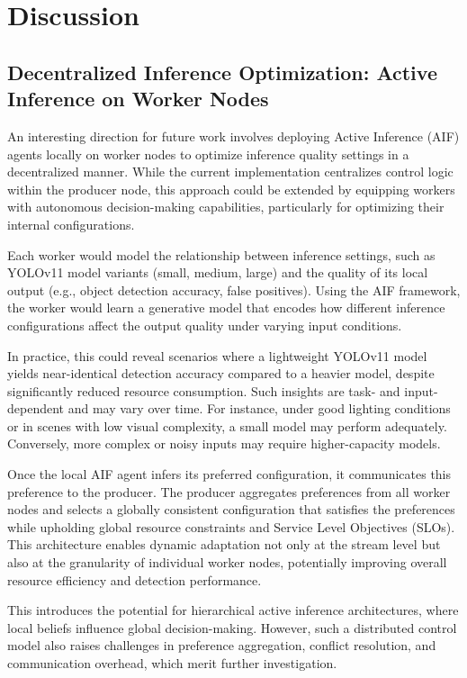 \chapter{Discussion}
\section{Decentralized Inference Optimization: Active Inference on Worker Nodes}

An interesting direction for future work involves deploying Active Inference (AIF) agents locally on worker nodes to optimize inference quality settings in a decentralized manner. While the current implementation centralizes control logic within the producer node, this approach could be extended by equipping workers with autonomous decision-making capabilities, particularly for optimizing their internal configurations.

Each worker would model the relationship between inference settings, such as YOLOv11 model variants (small, medium, large) and the quality of its local output (e.g., object detection accuracy, false positives). Using the AIF framework, the worker would learn a generative model that encodes how different inference configurations affect the output quality under varying input conditions.

In practice, this could reveal scenarios where a lightweight YOLOv11 model yields near-identical detection accuracy compared to a heavier model, despite significantly reduced resource consumption. Such insights are task- and input-dependent and may vary over time. For instance, under good lighting conditions or in scenes with low visual complexity, a small model may perform adequately. Conversely, more complex or noisy inputs may require higher-capacity models.

Once the local AIF agent infers its preferred configuration, it communicates this preference to the producer. The producer aggregates preferences from all worker nodes and selects a globally consistent configuration that satisfies the preferences while upholding global resource constraints and Service Level Objectives (SLOs). This architecture enables dynamic adaptation not only at the stream level but also at the granularity of individual worker nodes, potentially improving overall resource efficiency and detection performance.

This introduces the potential for hierarchical active inference architectures, where local beliefs influence global decision-making. However, such a distributed control model also raises challenges in preference aggregation, conflict resolution, and communication overhead, which merit further investigation.


